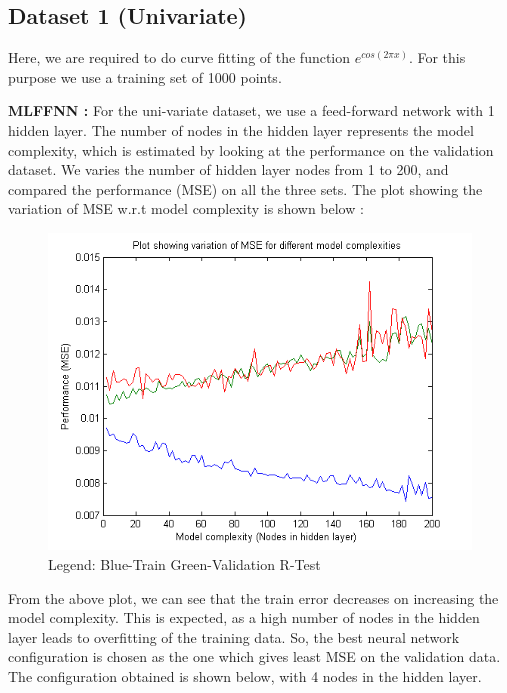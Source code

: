 \subsection{Dataset 1 (Univariate)}
\begin{flushleft}
Here, we are required to do curve fitting of the function $e^{cos(2 \pi x)}$. For this purpose we use a training set of 1000 points.



\end{flushleft}


\begin{flushleft}

\textbf{MLFFNN :}
For the uni-variate dataset, we use a feed-forward network with 1 hidden layer. The number of nodes in the hidden layer represents the model complexity, which is estimated by looking at the performance on the validation dataset. We varies the number of hidden layer nodes from 1 to 200, and compared the performance   (MSE) on all the three sets. The plot showing the variation of MSE w.r.t model complexity is shown below :

\end{flushleft}


\begin{figure}[H]
\centering
\includegraphics[width=\linewidth]{Regression/univariate/mse.png}
\caption{Legend: Blue-Train  Green-Validation R-Test}
\end{figure}

From the above plot, we can see that the train error decreases on increasing the model complexity. This is expected, as a high number of nodes in the hidden layer leads to overfitting of the training data. So, the best neural network configuration is chosen as the one which gives least MSE on the validation data.
The configuration obtained is shown below, with 4 nodes in the hidden layer.


